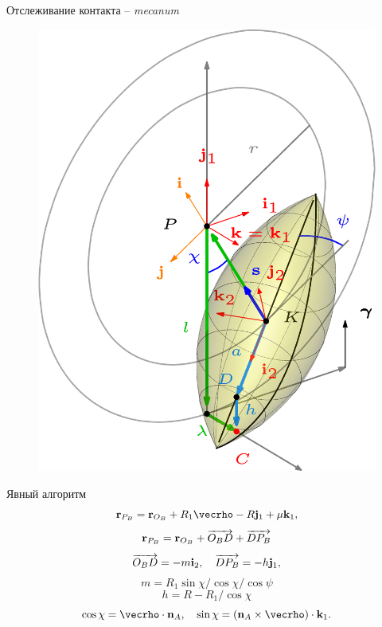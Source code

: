 \begin{frame}{Отслеживание контакта -- \textit{mecanum}}
        \begin{figure}[htb]
            \centering\includegraphics[width=\textwidth]{content/pic/asy/pic_mecanum.png}
            \label{ContactScheme}
        \end{figure}
    \endminipage
    \quad
        Явный алгоритм
        $$
        {\bf r}_{P_B}={\bf r}_{O_B}+R_1\vecrho -R{\bf j}_1+\mu {\bf k}_1,
        $$
        $$
        {\bf r}_{P_B}={\bf r}_{O_B}+\overrightarrow{O_BD}+\overrightarrow{DP_B}
        $$
        $$
        \overrightarrow{O_BD}=-m{\bf i}_2,\quad\overrightarrow{DP_B}=-h{\bf j}_1,
        $$
        $$m=R_1\sin\chi / \cos\chi/\cos\psi $$
        $$h=R-R_1/\cos\chi$$
        $$
        \cos\chi=\vecrho\cdot{\bf n}_A, \quad \sin\chi=
        \left({\bf n}_A\times\vecrho\right)\cdot {\bf k}_1.
        $$
    \endminipage
\end{frame}

